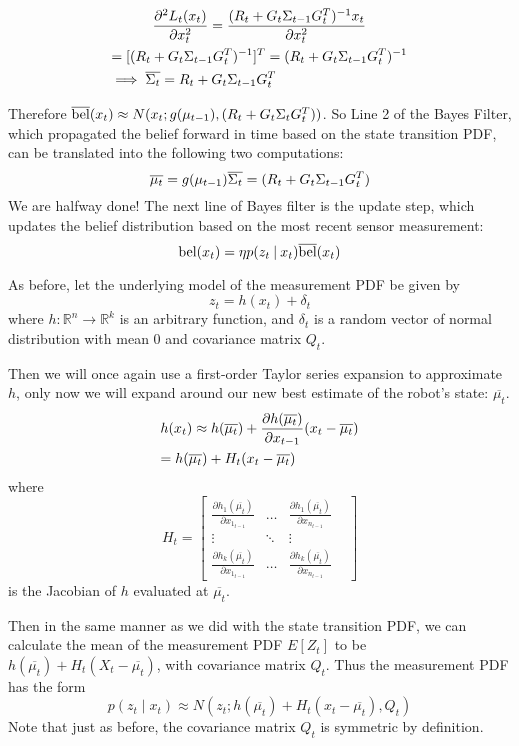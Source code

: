 \begin{multline*}
\frac{\partial^2 L_t(x_t) }{\partial x_t^2} = \frac{(R_t + G_t\Sigma_{t-1}G_t^T)^{-1}x_t}{\partial x_t^2} \\
= [(R_t + G_t\Sigma_{t-1}G_t^T)^{-1}]^T = (R_t + G_t\Sigma_{t-1}G_t^T)^{-1} \\
\implies \overline{\Sigma_t} = R_t + G_t\Sigma_{t-1}G_t^T \hfill
\end{multline*}

Therefore \(\overline{\mathrm{bel}}(x_t) \approx N(x_t;g(\mu_{t-1}),(R_t + G_t\Sigma_tG_t^T))\). So Line 2 of the Bayes Filter, which propagated the belief forward in time based on the state transition PDF, can be translated into the following two computations:
\[
\overline{\mu_t} = g(\mu_{t-1}) \\
\overline{\Sigma_t} = (R_t + G_t\Sigma_{t-1}G_t^T)
\]
We are halfway done! The next line of Bayes filter is the update step, which updates the belief distribution based on the most recent sensor measurement:
\[
\mathrm{bel}(x_t) = \eta p(z_t \mathbin{\vert} x_t) \overline{\mathrm{bel}}(x_t)
\]

As before, let the underlying model of the measurement PDF be given by \[z_t =  h(x_t) + \delta_t\] where \(h: \mathbb{R}^n \to \mathbb{R}^k\) is an arbitrary function, and \(\delta_t\) is a random vector of normal distribution with mean 0 and covariance matrix \(Q_t\).

Then we will once again use a first-order Taylor series expansion to approximate \(h\), only now we will expand around our new best estimate of the robot's state: \(\overline{\mu_t}\).
\begin{multline*}
h(x_t) \approx h(\overline{\mu_t}) + \frac{\partial h(\overline{\mu_t})}{\partial x_{t-1}} (x_t - \overline{\mu_t}) \\
= h(\overline{\mu_t}) + H_t (x_t - \overline{\mu_t}) \hfill
\end{multline*}
where \[
H_t = \begin{bmatrix} 
\frac{\partial h_1(\overline{\mu_t})}{\partial x_{1_{t-1}}} & \dots & \frac{\partial h_1(\overline{\mu_t})}{\partial x_{n_{t-1}}}\\
\vdots & \ddots & \vdots & \\
\frac{\partial h_k(\overline{\mu_t})}{\partial x_{1_{t-1}}} & \dots & \frac{\partial h_k(\overline{\mu_t})}{\partial x_{n_{t-1}}} 
\end{bmatrix} \] is the Jacobian of \(h\) evaluated at \(\overline{\mu_t}\).

Then in the same manner as we did with the state transition PDF, we can calculate the mean of the measurement PDF \(E[Z_t]\) to be \(h(\overline{\mu_t}) + H_t (X_t - \overline{\mu_t})\), with covariance matrix \(Q_t\). Thus the measurement PDF has the form \[p(z_t \mathbin{\vert} x_t)  \approx N(z_t;h(\overline{\mu_t}) + H_t (x_t - \overline{\mu_t}),Q_t)\] Note that just as before, the covariance matrix \(Q_t\) is symmetric by definition.

